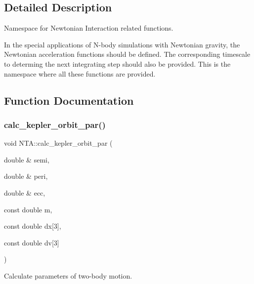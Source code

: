 \subsection{Detailed Description}
Namespace for Newtonian Interaction related functions. 

In the special applications of N-\/body simulations with Newtonian gravity, the Newtonian acceleration functions should be defined. The corresponding timescale to determing the next integrating step should also be provided. This is the namespace where all these functions are provided. 

\subsection{Function Documentation}
\hypertarget{namespaceNTA_afeafba4c0eba0bd136281e667fe8096d}{}\label{namespaceNTA_afeafba4c0eba0bd136281e667fe8096d} 
\subsubsection{\texorpdfstring{calc\+\_\+kepler\+\_\+orbit\+\_\+par()}{calc\_kepler\_orbit\_par()}}
{\footnotesize\ttfamily void N\+T\+A\+::calc\+\_\+kepler\+\_\+orbit\+\_\+par (\begin{DoxyParamCaption}\item[{double \&}]{semi,  }\item[{double \&}]{peri,  }\item[{double \&}]{ecc,  }\item[{const double}]{m,  }\item[{const double}]{dx\mbox{[}3\mbox{]},  }\item[{const double}]{dv\mbox{[}3\mbox{]} }\end{DoxyParamCaption})}



Calculate parameters of two-\/body motion. 

